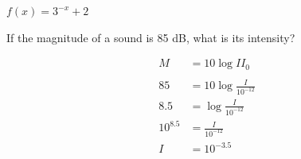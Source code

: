 \documentclass[fleqn,addpoints]{exam}
\begin{document}
\begin{questions}
\begin{parts}
      \end{parts}

    \question $f(x) = 3^{-x} + 2$

    \question[5]
      If the magnitude of a sound is 85 dB, what is its intensity?  
      

      \begin{solution}
        \begin{align*}
          M        & = 10 \log{I}{I_0} \\
          \\
          85       & = 10 \log \frac{I}{10^{-12}} \\
          8.5      & = \log \frac{I}{10^{-12}} \\
          10^{8.5} & = \frac{I}{10^{-12}} \\
          I        & = 10^{-3.5} \\
        \end{align*}
      \end{solution}



\end{questions}
\end{document}
